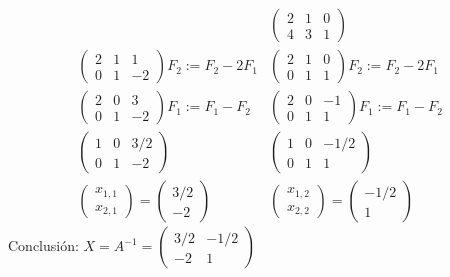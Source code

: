 \documentclass[11pt,a4paper]{article}
\begin{document}
\begin{ejemplo}
\[\begin{array}{ll}
&
\left(\begin{array}{cc|c}2&1&0\\4&3&1\end{array}\right)
\\[12pt]
\left(\begin{array}{cc|c}2&1&1\\0&1&-2\end{array}\right)F_2:=F_2-2F_1
&
\left(\begin{array}{cc|c}2&1&0\\0&1&1\end{array}\right)F_2:=F_2-2F_1
\\[12pt]
\left(\begin{array}{cc|c}2&0&3\\0&1&-2\end{array}\right)F_1:=F_1-F_2
&
\left(\begin{array}{cc|c}2&0&-1\\0&1&1\end{array}\right)F_1:=F_1-F_2
\\[12pt]
\left(\begin{array}{cc|c}1&0&3/2\\0&1&-2\end{array}\right)
&
\left(\begin{array}{cc|c}1&0&-1/2\\0&1&1\end{array}\right)
\\[12pt]
\begin{pmatrix}x_{1,1}\\x_{2,1}\end{pmatrix}=\begin{pmatrix}3/2\\-2\end{pmatrix}
&
\begin{pmatrix}x_{1,2}\\x_{2,2}\end{pmatrix}=\begin{pmatrix}-1/2\\1\end{pmatrix}
\end{array}
\]
Conclusión: $X=A^{-1}=\begin{pmatrix}3/2&-1/2\\-2&1\end{pmatrix}$


\end{ejemplo}
\end{document}
